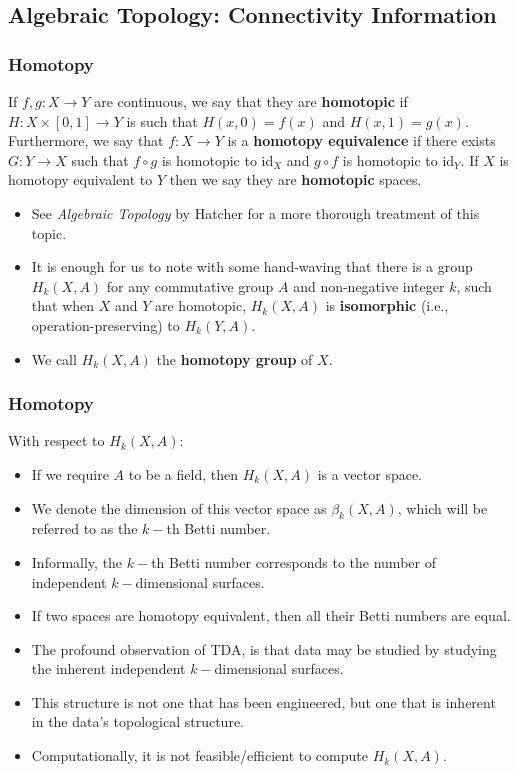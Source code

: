 	\subsection{Algebraic Topology: Connectivity Information}
		\begin{frame}
		\frametitle{Homotopy}
		
		\begin{definition}
			If $f,g:X\rightarrow Y$ are continuous, we say that they are \textbf{homotopic} if $H:X\times[0,1]\rightarrow Y$ is such that $H(x,0)=f(x)$
			and $H(x,1)=g(x)$. Furthermore, we say that $f:X\rightarrow Y$ is a \textbf{homotopy equivalence} if there exists $G:Y\rightarrow X$ such 
			that $f\circ g$ is homotopic to $\mathrm{id}_X$ and $g\circ f$ is homotopic to $\mathrm{id}_Y$. If $X$ is homotopy equivalent to $Y$ then 
			we say they are \textbf{homotopic} spaces.
		\end{definition}

		\begin{itemize}
			\item See \textit{Algebraic Topology} by Hatcher for a more thorough treatment of this topic.
			\item It is enough for us to note with some hand-waving that there is a group $H_k(X,A)$ for any commutative group $A$ and non-negative 
			integer $k$, such that when $X$ and $Y$ are homotopic, $H_k(X,A)$ is \textbf{isomorphic} (i.e., operation-preserving) to $H_k(Y,A)$. 
			\item We call $H_k(X,A)$ the \textbf{homotopy group} of $X$.
		\end{itemize}
		\end{frame}
		
		\begin{frame}
		\frametitle{Homotopy}
		With respect to $H_k(X,A)$:
		\begin{itemize}
			\item If we require $A$ to be a field, then $H_k(X,A)$ is a vector space.
			\item We denote the dimension of this vector space as $\beta_k(X,A)$, which will be referred to as the $k-$th Betti number.
			\item Informally, the $k-$th Betti number corresponds to the number of independent $k-$dimensional surfaces.
			\item If two spaces are homotopy equivalent, then all their Betti numbers are equal.
			\item The profound observation of TDA, is that data may be studied by studying the inherent independent $k-$dimensional surfaces.
			\item This structure is not one that has been engineered, but one that is inherent in the data's topological structure.
			\item Computationally, it is not feasible/efficient to compute $H_k(X,A)$.
		\end{itemize}
		\end{frame}

